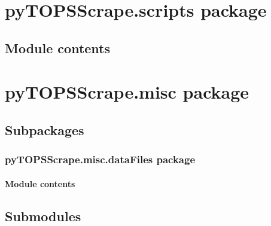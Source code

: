 \documentclass[letterpaper,10pt,english]{sphinxmanual}
\begin{document}
\chapter{pyTOPSScrape.scripts package}
\label{\detokenize{pyTOPSScrape.scripts:pytopsscrape-scripts-package}}\label{\detokenize{pyTOPSScrape.scripts::doc}}

\section{Module contents}
\label{\detokenize{pyTOPSScrape.scripts:module-pyTOPSScrape.scripts}}\label{\detokenize{pyTOPSScrape.scripts:module-contents}}

\chapter{pyTOPSScrape.misc package}
\label{\detokenize{pyTOPSScrape.misc:pytopsscrape-misc-package}}\label{\detokenize{pyTOPSScrape.misc::doc}}

\section{Subpackages}
\label{\detokenize{pyTOPSScrape.misc:subpackages}}

\subsection{pyTOPSScrape.misc.dataFiles package}
\label{\detokenize{pyTOPSScrape.misc.dataFiles:pytopsscrape-misc-datafiles-package}}\label{\detokenize{pyTOPSScrape.misc.dataFiles::doc}}

\subsubsection{Module contents}
\label{\detokenize{pyTOPSScrape.misc.dataFiles:module-pyTOPSScrape.misc.dataFiles}}\label{\detokenize{pyTOPSScrape.misc.dataFiles:module-contents}}

\section{Submodules}
\label{\detokenize{pyTOPSScrape.misc:submodules}}
\end{document}
